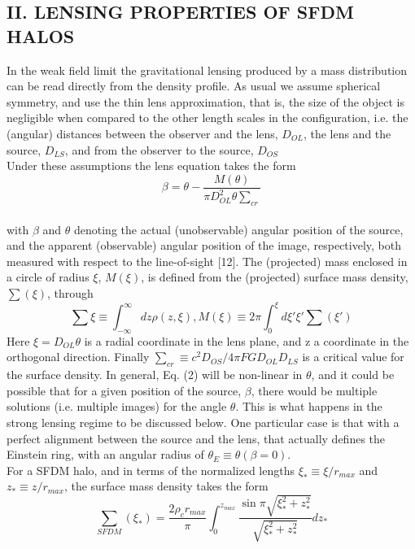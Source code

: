 \documentclass{article}
\begin{document}
\begin{multicols}{2}[]
\begin{center}
\section*{\normalsize{II.  LENSING PROPERTIES OF SFDM HALOS}}
\end{center}
In the weak field limit the gravitational lensing produced by a mass distribution can be read directly from
the density profile. As usual we assume spherical symmetry, and use the thin lens approximation, that is, the size
of the object is negligible when compared to the other
length scales in the configuration, i.e. the (angular) distances between the observer and the lens, $D_{OL}$, the lens
and the source, $D_{LS}$, and from the observer to the source,
$D_{OS}$ \\Under these assumptions the lens equation takes the form
\begin{equation}
    \beta=\theta-\frac{M(\theta)}{\pi{D^2_{OL}\theta{\sum_{cr}}}}
\end{equation}
\\with $\beta$ and $\theta$ denoting the actual (unobservable) angular
position of the source, and the apparent (observable) angular position of the image, respectively, both measured
with respect to the line-of-sight [12]. The (projected)
mass enclosed in a circle of radius $\xi$, $M(\xi)$, is defined
from the (projected) surface mass density, $\sum(\xi)$, through
\begin{equation}
\sum\xi\equiv{\int_{-\infty}^{\infty}dz\rho(z,\xi)}, M(\xi)\equiv{2\pi}{\int_{0}^{\xi}d\xi'\xi'\sum(\xi')}  
\end{equation}
Here $\xi=D_{OL}\theta$ is a radial coordinate in the lens plane, and z a coordinate in the orthogonal direction. Finally
$\sum_{cr}{\equiv}c^2D_{OS}/4{\pi}FGD_{OL}D_{LS}$
 is a critical value for the surface density.
 In general, Eq. (2) will be non-linear in $\theta$, and it could
be possible that for a given position of the source, $\beta$, there
would be multiple solutions (i.e. multiple images) for
the angle $\theta$. This is what happens in the strong lensing
regime to be discussed below. One particular case is that
with a perfect alignment between the source and the lens,
that actually defines the Einstein ring, with an angular
radius of $\theta_E{\equiv} \theta(\beta=0)$.
\\For a SFDM halo, and in terms of the normalized
lengths $\xi_*{\equiv}\xi/r_{max}$ and $z_*{\equiv}z/r_{max}$, the surface mass
density takes the form
\begin{equation}
{\sum}_{SFDM}(\xi_*)=\frac{2\rho_cr_{max}}{\pi}\int_{0}^{z_{max}}\frac{\sin{\pi\sqrt{\xi_*^2+z_*^2}}}{\sqrt{\xi_*^2+z_*^2}}dz_*

\end{equation}
\end{multicols}
\end{document}
